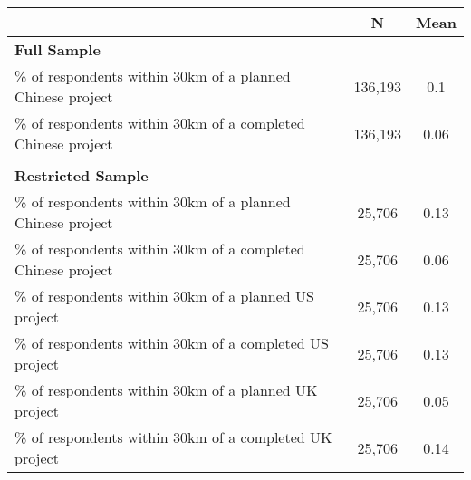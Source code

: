  \begin{tabular}{l cc} 
 & N & Mean \\ 
 \hline  {\bf Full Sample} & & \\ 
 \% of respondents within 30km of a planned Chinese project  &  136,193  &  0.1  \\ \% of respondents within 30km of a completed Chinese project  &  136,193  &  0.06  \\   & & \\ 
  {\bf Restricted Sample} & & \\ 
 \% of respondents within 30km of a planned Chinese project  &  25,706  &  0.13  \\ \% of respondents within 30km of a completed Chinese project  &  25,706  &  0.06  \\ \% of respondents within 30km of a planned US project  &  25,706  &  0.13  \\ \% of respondents within 30km of a completed US project  &  25,706  &  0.13  \\ \% of respondents within 30km of a planned UK project  &  25,706  &  0.05  \\ \% of respondents within 30km of a completed UK project  &  25,706  &  0.14  \\ \hline  \end{tabular}